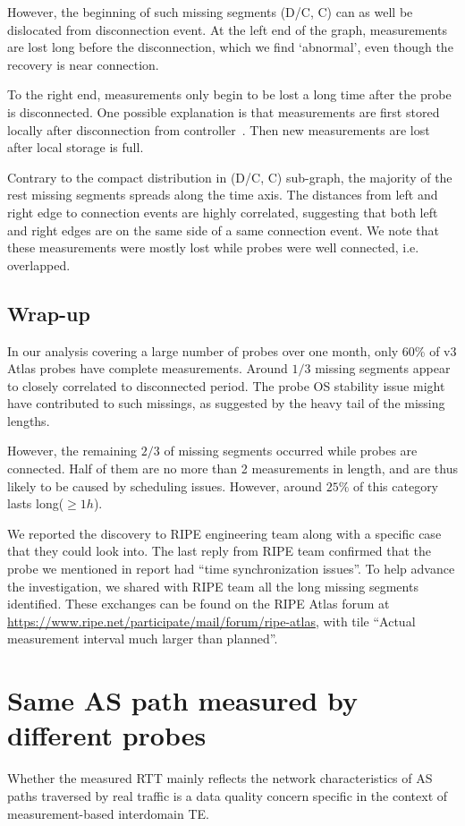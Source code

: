 However, the beginning of such missing segments (D/C, C) can as well be dislocated from disconnection event.
At the left end of the graph, measurements are lost long before the disconnection, which we find `abnormal', even though the recovery is near connection.

To the right end, measurements only begin to be lost a long time after the probe is disconnected. One possible explanation is that measurements are first stored locally after disconnection from controller~\cite{usb}. Then new measurements are lost after local storage is full.

Contrary to the compact distribution in (D/C, C) sub-graph, the majority of the rest missing segments spreads along the time axis. 
The distances from left and right edge to connection events are highly correlated, suggesting that both left and right edges are on the same side of a same connection event.
We note that these measurements were mostly lost while probes were well connected, i.e. overlapped.

\subsection*{Wrap-up}
In our analysis covering a large number of probes over one month, only 60\% of v3 Atlas probes have complete measurements. Around $1/3$ missing segments appear to closely correlated to disconnected period. The probe OS stability issue might have contributed to such missings, as suggested by the heavy tail of the missing lengths.

However, the remaining $2/3$ of missing segments occurred while probes are connected. 
Half of them are no more than 2 measurements in length, and are thus likely to be caused by scheduling issues. However, around $25\%$ of this category lasts long($\geq 1h$). 

We reported the discovery to RIPE engineering team along with a specific case that they could look into.
The last reply from RIPE team confirmed that the probe we mentioned in report had ``time synchronization issues''. To help advance the investigation, we shared with RIPE team all the long missing segments identified. These exchanges can be found on the RIPE Atlas forum at \url{https://www.ripe.net/participate/mail/forum/ripe-atlas}, with tile ``Actual measurement interval much larger than planned''.

\section{Same AS path measured by different probes}
Whether the measured RTT mainly reflects the network characteristics of AS paths traversed by real traffic is a data quality concern specific in the context of measurement-based interdomain TE.

